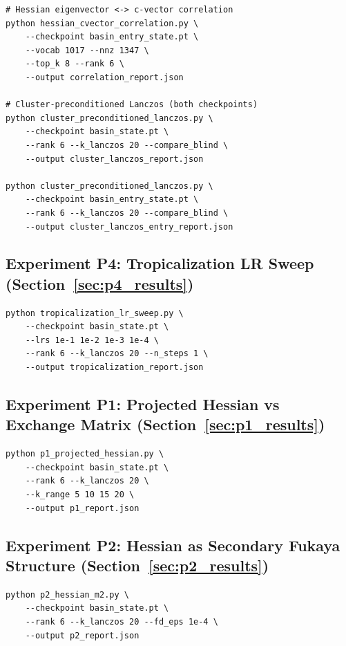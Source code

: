 \documentclass[11pt]{amsart}
\begin{document}
\begin{verbatim}
# Hessian eigenvector <-> c-vector correlation
python hessian_cvector_correlation.py \
    --checkpoint basin_entry_state.pt \
    --vocab 1017 --nnz 1347 \
    --top_k 8 --rank 6 \
    --output correlation_report.json

# Cluster-preconditioned Lanczos (both checkpoints)
python cluster_preconditioned_lanczos.py \
    --checkpoint basin_state.pt \
    --rank 6 --k_lanczos 20 --compare_blind \
    --output cluster_lanczos_report.json

python cluster_preconditioned_lanczos.py \
    --checkpoint basin_entry_state.pt \
    --rank 6 --k_lanczos 20 --compare_blind \
    --output cluster_lanczos_entry_report.json
\end{verbatim}

\subsection*{Experiment P4: Tropicalization LR Sweep
  (Section~\ref{sec:p4_results})}

\begin{verbatim}
python tropicalization_lr_sweep.py \
    --checkpoint basin_state.pt \
    --lrs 1e-1 1e-2 1e-3 1e-4 \
    --rank 6 --k_lanczos 20 --n_steps 1 \
    --output tropicalization_report.json
\end{verbatim}

\subsection*{Experiment P1: Projected Hessian vs Exchange Matrix
  (Section~\ref{sec:p1_results})}

\begin{verbatim}
python p1_projected_hessian.py \
    --checkpoint basin_state.pt \
    --rank 6 --k_lanczos 20 \
    --k_range 5 10 15 20 \
    --output p1_report.json
\end{verbatim}

\subsection*{Experiment P2: Hessian as Secondary Fukaya Structure
  (Section~\ref{sec:p2_results})}

\begin{verbatim}
python p2_hessian_m2.py \
    --checkpoint basin_state.pt \
    --rank 6 --k_lanczos 20 --fd_eps 1e-4 \
    --output p2_report.json
\end{verbatim}
\end{document}
